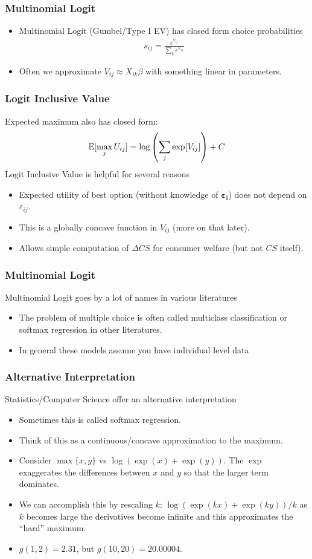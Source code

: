 \begin{frame}
\frametitle{Multinomial Logit}
\begin{itemize}
\item Multinomial Logit (Gumbel/Type I EV) has closed form choice probabilities
\begin{eqnarray*}
s_{ij} = \frac{e^{V_{ij}}}{\sum_k e^{V_{ik}}}
\end{eqnarray*}
\item Often we approximate $V_{ij} \approx  X_{ik} \beta$ with something linear in parameters.
\end{itemize}
\end{frame}


\begin{frame}
\frametitle{Logit Inclusive Value}
 Expected maximum also has closed form:
\begin{eqnarray*}
\mathbb{E}[\max_j U_{ij}] = \log \left(\sum_j \exp[V_{ij}] \right) + C
\end{eqnarray*}
Logit Inclusive Value is helpful for several reasons
\begin{itemize}
\item Expected utility of best option (without knowledge of $\boldsymbol{\varepsilon_i}$) does not depend on $\varepsilon_{ij}$.
\item This is a globally concave function in $V_{ij}$ (more on that later).
\item Allows simple computation of $\Delta CS$ for consumer welfare (but not $CS$ itself).
\end{itemize}
\end{frame}

\begin{frame}
\frametitle{Multinomial Logit}
Multinomial Logit goes by a lot of names in various literatures
\begin{itemize}
\item The problem of multiple choice is often called \alert{multiclass classification} or \alert{softmax regression} in other literatures.
\item In general these models assume you have individual level data
\end{itemize}
\end{frame}

\begin{frame}
\frametitle{Alternative Interpretation}
Statistics/Computer Science offer an alternative interpretation
\begin{itemize}
\item Sometimes this is called \alert{softmax} regression.
\item Think of this as a continuous/concave approximation to the maximum.
\item Consider $\max\{x,y\}$ vs $\log(\exp(x) + \exp(y))$. The $\exp$ exaggerates the differences between $x$ and $y$ so that the larger term dominates.
\item We can accomplish this by rescaling $k$:  $\log(\exp(kx) + \exp(ky))/k$ as $k$ becomes large the derivatives become infinite and this approximates the ``hard'' maximum.
\item $g(1, 2) = 2.31$, but $g(10, 20) = 20.00004$.
\end{itemize}
\end{frame}


